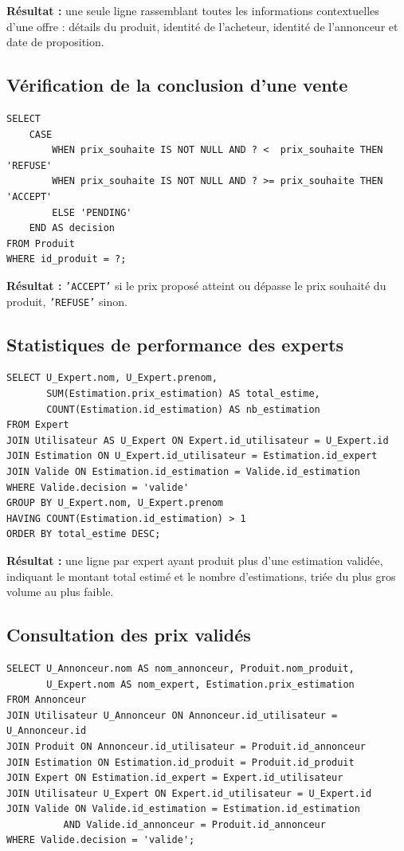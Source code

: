 \documentclass{article}
\theoremstyle{plain}
\theoremstyle{definition}
\begin{document}
\noindent\textbf{Résultat :} une seule ligne rassemblant toutes les
informations contextuelles d'une offre : détails du produit, identité de
l'acheteur, identité de l'annonceur et date de proposition.
 
\subsection*{Vérification de la conclusion d'une vente}
 
\begin{verbatim}
SELECT
    CASE
        WHEN prix_souhaite IS NOT NULL AND ? <  prix_souhaite THEN 'REFUSE'
        WHEN prix_souhaite IS NOT NULL AND ? >= prix_souhaite THEN 'ACCEPT'
        ELSE 'PENDING'
    END AS decision
FROM Produit
WHERE id_produit = ?;
\end{verbatim}
 
\noindent\textbf{Résultat :} \texttt{'ACCEPT'} si le prix proposé
atteint ou dépasse le prix souhaité du produit, \texttt{'REFUSE'} sinon.
 
\subsection*{Statistiques de performance des experts}
 
\begin{verbatim}
SELECT U_Expert.nom, U_Expert.prenom,
       SUM(Estimation.prix_estimation) AS total_estime,
       COUNT(Estimation.id_estimation) AS nb_estimation
FROM Expert
JOIN Utilisateur AS U_Expert ON Expert.id_utilisateur = U_Expert.id
JOIN Estimation ON U_Expert.id_utilisateur = Estimation.id_expert
JOIN Valide ON Estimation.id_estimation = Valide.id_estimation
WHERE Valide.decision = 'valide'
GROUP BY U_Expert.nom, U_Expert.prenom
HAVING COUNT(Estimation.id_estimation) > 1
ORDER BY total_estime DESC;
\end{verbatim}
 
\noindent\textbf{Résultat :} une ligne par expert ayant produit plus
d'une estimation validée, indiquant le montant total estimé et le nombre
d'estimations, triée du plus gros volume au plus faible.
 
\subsection*{Consultation des prix validés}
 
\begin{verbatim}
SELECT U_Annonceur.nom AS nom_annonceur, Produit.nom_produit,
       U_Expert.nom AS nom_expert, Estimation.prix_estimation
FROM Annonceur
JOIN Utilisateur U_Annonceur ON Annonceur.id_utilisateur = U_Annonceur.id
JOIN Produit ON Annonceur.id_utilisateur = Produit.id_annonceur
JOIN Estimation ON Estimation.id_produit = Produit.id_produit
JOIN Expert ON Estimation.id_expert = Expert.id_utilisateur
JOIN Utilisateur U_Expert ON Expert.id_utilisateur = U_Expert.id
JOIN Valide ON Valide.id_estimation = Estimation.id_estimation
          AND Valide.id_annonceur = Produit.id_annonceur
WHERE Valide.decision = 'valide';
\end{verbatim}
 
\end{document}
